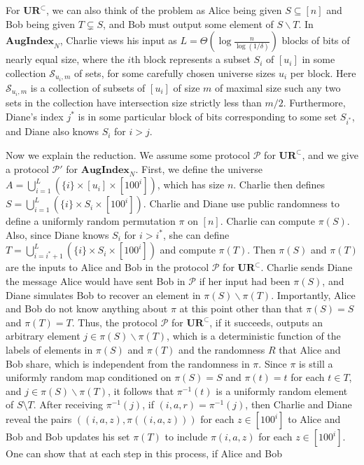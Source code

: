 \documentclass[11pt]{article}
\newcommand{\aug}{\mathbf{AugIndex}\xspace}
\newcommand{\ur}{\mathbf{UR}\xspace}
\begin{document}
For $\ur^\subset$, we can also think of the problem as Alice being given $S\subseteq[n]$ and Bob being given $T\subsetneq S$, and Bob must output some element of $S\backslash T$. In $\aug_N$, Charlie views his input as $L = \Theta(\log \frac n{\log(1/\delta)})$ blocks of bits of nearly equal size, where the $i$th block represents a subset $S_i$ of $[u_i]$ in some collection $\mathcal S_{u_i,m}$ of sets, for some carefully chosen universe sizes $u_i$ per block. Here $\mathcal S_{u_i,m}$ is a collection of subsets of $[u_i]$ of size $m$ of maximal size such any two sets in the collection have intersection size strictly less than $m/2$. Furthermore,  Diane's index $j^*$ is in some particular block of bits corresponding to some set $S_{i^*}$, and Diane also knows $S_i$ for $i>j$.

Now we explain the reduction. We assume some protocol $\mathcal P$ for $\ur^\subset$, and we give a protocol $\mathcal P'$ for $\aug_N$. First, we define the universe $A = \bigcup_{i=1}^L (\{i\} \times [u_i]\times [100^i])$, which has size $n$. Charlie then defines $S = \bigcup_{i=1}^L (\{i\} \times S_i \times [100^i])$. Charlie and
Diane use public randomness to define a uniformly random permutation $\pi$ on $[n]$. Charlie can compute
$\pi(S)$. Also, since Diane knows $S_i$ for $i > i^*$, she can define $T =  \bigcup_{i=i^*+1}^L (\{i\} \times S_i \times [100^i])$
and compute $\pi(T)$. Then $\pi(S)$ and $\pi(T)$ are the inputs to Alice and Bob in the protocol $\mathcal P$
for $\ur^\subset$. Charlie sends Diane the message Alice would have sent Bob in $\mathcal P$ if her input had been $\pi(S)$, and Diane simulates Bob to recover an element in $\pi(S)\backslash \pi(T)$.
Importantly, Alice and Bob do not know anything about $\pi$ at this point other than that $\pi(S) = S$ and $\pi(T) = T$. Thus,
the protocol $\mathcal P$ for $\ur^\subset$, if it succeeds, outputs an arbitrary element $j \in \pi(S) \backslash \pi(T)$, which is a 
deterministic function of the labels of elements in $\pi(S)$ and $\pi(T)$ and the randomness $R$ that Alice and Bob share, which is independent from the randomness in $\pi$. Since $\pi$ is still a uniformly random map conditioned on $\pi(S) = S$
and $\pi(t) = t$ for each $t \in T$, and $j \in \pi(S) \backslash \pi(T)$, it follows that $\pi^{-1}(t)$ is a uniformly random element
of $S \setminus T$. After receiving $\pi^{-1}(j)$, if $(i, a, r) = \pi^{-1}(j)$, then
Charlie and Diane reveal the pairs $((i, a, z), \pi((i,a,z)))$ for each $z \in [100^i]$ to Alice and Bob and Bob updates
his set $\pi(T)$ to include $\pi(i,a,z)$ for each $z \in [100^i]$. One can show that at each step in this process, if Alice and Bob
\end{document}
